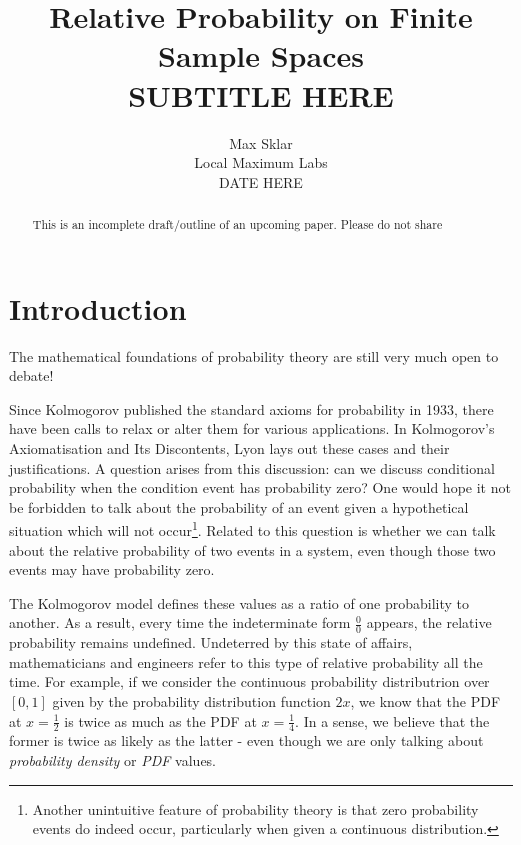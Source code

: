 \documentclass[twoside]{article}
\theoremstyle{plain}%
\theoremstyle{definition}
\theoremstyle{remark}
\begin{document}
\parindent=0in
\parskip=12pt


\title{
  Relative Probability on Finite Sample Spaces \\
  \large{
    SUBTITLE HERE
  }
}

\author{Max Sklar\\ Local Maximum Labs \\ DATE HERE}
\date{}

\maketitle
\thispagestyle{empty}

\begin{abstract}
This is an incomplete draft/outline of an upcoming paper. Please do not share
\end{abstract}

\tableofcontents
\newpage

\section{Introduction}

The mathematical foundations of probability theory are still very much open to debate!

Since Kolmogorov published the standard axioms for probability in 1933, there
have been calls to relax or alter them for various applications. In Kolmogorov's
Axiomatisation and Its Discontents\cite{lyon}, Lyon lays out these cases and
their justifications. A question arises from this discussion: can we discuss conditional probability when the condition event has probability zero? One would hope it not be forbidden to talk about the probability of an event given a hypothetical situation which will not occur\footnote{Another unintuitive feature of probability theory is that zero probability events do indeed occur, particularly when given a continuous distribution.}. Related to this question is whether we can talk about the relative probability of two events in a system, even though those two events may have probability zero.

The Kolmogorov model defines these values as a ratio of one probability to another. As a result, every time the indeterminate form \(\frac{0}{0}\) appears, the relative probability remains undefined. Undeterred by this state of affairs, mathematicians and engineers refer to this type of relative probability all the time. For example, if we consider the continuous probability distributrion over \([0, 1]\) given by the probability distribution function \(2x\), we know that the PDF at \(x = \frac{1}{2}\) is twice as much as the PDF at \(x = \frac{1}{4}\). In a sense, we believe that the former is twice as likely as the latter - even though we are only talking about \textit{probability density} or \textit{PDF} values.
\end{document}
